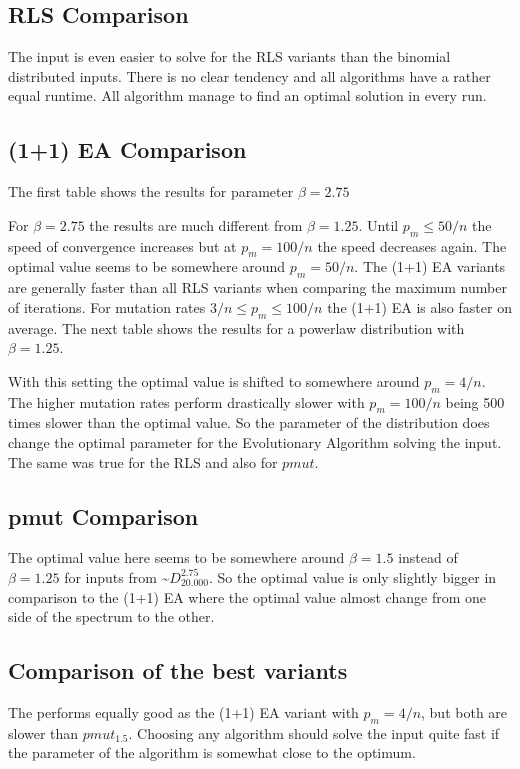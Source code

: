 \subsection{RLS Comparison}

The input is even easier to solve for the RLS variants than the binomial distributed inputs.
There is no clear tendency and all algorithms have a rather equal runtime.
All algorithm manage to find an optimal solution in every run.
\subsection{(1+1) EA Comparison}
The first table shows the results for parameter $\beta=2.75$



For $\beta=2.75$ the results are much different from $\beta=1.25$.
Until $p_m\le50/n$ the speed of convergence increases but at $p_m=100/n$ the speed decreases again.
The optimal value seems to be somewhere around $p_m=50/n$.
The (1+1) EA variants are generally faster than all RLS variants when comparing the maximum number of iterations.
For mutation rates $3/n\le p_m \le 100/n$ the (1+1) EA is also faster on average.
The next table shows the results for a powerlaw distribution with $\beta=1.25$.


With this setting the optimal value is shifted to somewhere around $p_m=4/n$.
The higher mutation rates perform drastically slower with $p_m=100/n$ being 500 times slower than the optimal value.
So the parameter of the distribution does change the optimal parameter for the Evolutionary Algorithm solving the input.
The same was true for the RLS and also for $pmut$.
\subsection{pmut Comparison}


The optimal value here seems to be somewhere around $\beta=1.5$ instead of $\beta =1.25$ for inputs from \textasciitilde$D^{2.75}_{20.000}$. 
So the optimal value is only slightly bigger in comparison to the (1+1) EA where the optimal value almost change from one side of the spectrum to the other.

\subsection{Comparison of the best variants}
The \RLSR[4] performs equally good as the (1+1) EA variant with $p_m=4/n$, but both are slower than $pmut_{1.5}$.
Choosing any algorithm should solve the input quite fast if the parameter of the algorithm is somewhat close to the optimum.

